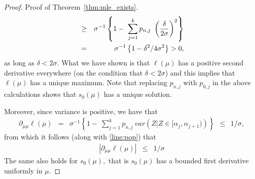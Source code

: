 \documentclass[12pt]{article} %
\begin{document}
\begin{proof}{Proof of Theorem~\ref{thm:mle_exists}.}
\begin{eqnarray}
&\geq & \sigma^{-1} \left\{1- \ \sum_{j=1}^k p_{n,j} \ \left( \frac{\delta}{2\sigma}\right)^2\right\}\notag\\
&=& \sigma^{-1} \left\{1-\delta^2/4\sigma^2\right\} > 0,
\end{eqnarray}
as long as $\delta <2\sigma .$  What we have shown is that $\ell(\mu)$ has a positive second derivative everywhere (on the condition that $\delta<2\sigma$) and this implies that $\ell(\mu)$ has a unique maximum.  Note that replacing $p_{n,j}$ with $p_{0,j}$ in the above calculations shows that $s_0(\mu)$ has a unique solution.  

Moreover, since variance is positive, we have that 
\begin{eqnarray*}
\partial_{\mu \mu} \ell(\mu) &= &\sigma^{-1} \left\{1- \ \sum_{j=1}^k p_{n,j} \ var\left(Z\vert Z \in [\alpha_{j},\alpha_{j+1})\right)\right\}
\ \ \leq \ \ 1/\sigma,
\end{eqnarray*}
from which it follows (along with \eqref{line:pop}) that 
\begin{eqnarray*}
\left\vert \partial_{\mu \mu} \ell(\mu) \right\vert &\leq & 1/\sigma
\end{eqnarray*}
The same also holds for $s_0(\mu),$ that is $s_0(\mu)$ has a bounded first derivative uniformly in $\mu.$  


\end{proof}
\end{document}
